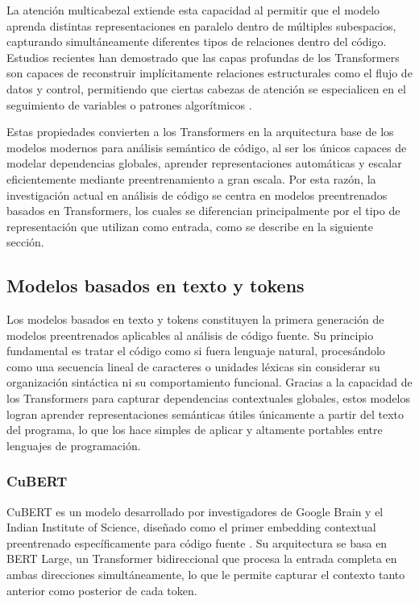 La atención multicabezal extiende esta capacidad al permitir que el modelo aprenda 
distintas representaciones en paralelo dentro de múltiples subespacios, capturando 
simultáneamente diferentes tipos de relaciones dentro del código. Estudios recientes 
han demostrado que las capas profundas de los Transformers son capaces de reconstruir 
implícitamente relaciones estructurales como el flujo de datos y control, permitiendo 
que ciertas cabezas de atención se especialicen en el seguimiento de variables o 
patrones algorítmicos \cite{Vaswani2017Attention}.

Estas propiedades convierten a los Transformers en la arquitectura base de los 
modelos modernos para análisis semántico de código, al ser los únicos capaces de 
modelar dependencias globales, aprender representaciones automáticas y escalar 
eficientemente mediante preentrenamiento a gran escala. Por esta razón, la 
investigación actual en análisis de código se centra en modelos preentrenados basados 
en Transformers, los cuales se diferencian principalmente por el tipo de 
representación que utilizan como entrada, como se describe en la siguiente sección.

\subsection{Modelos basados en texto y tokens}

Los modelos basados en texto y tokens constituyen la primera generación de modelos 
preentrenados aplicables al análisis de código fuente. Su principio fundamental es 
tratar el código como si fuera lenguaje natural, procesándolo como una secuencia 
lineal de caracteres o unidades léxicas sin considerar su organización sintáctica 
ni su comportamiento funcional. Gracias a la capacidad de los Transformers para 
capturar dependencias contextuales globales, estos modelos logran aprender 
representaciones semánticas útiles únicamente a partir del texto del programa, 
lo que los hace simples de aplicar y altamente portables entre lenguajes de 
programación.

\subsubsection{CuBERT}

CuBERT es un modelo desarrollado por investigadores de Google Brain y el Indian 
Institute of Science, diseñado como el primer embedding contextual preentrenado 
específicamente para código fuente \cite{Kanade2020CuBERT}. Su arquitectura se 
basa en BERT Large, un Transformer bidireccional que procesa la entrada completa 
en ambas direcciones simultáneamente, lo que le permite capturar el contexto 
tanto anterior como posterior de cada token.


